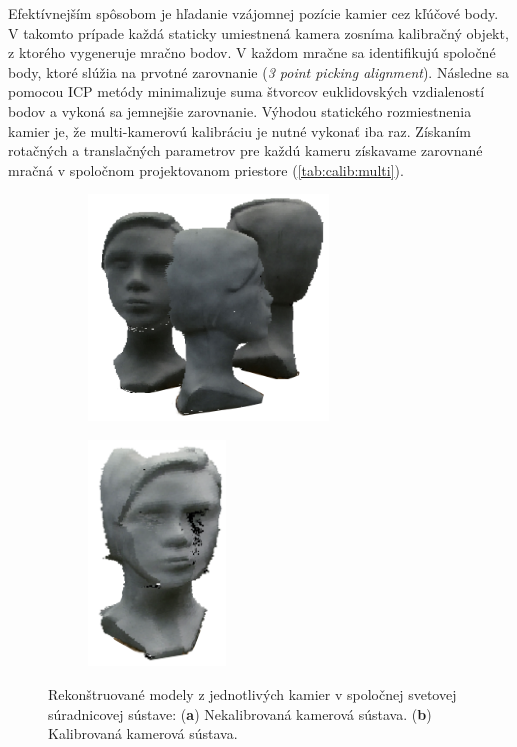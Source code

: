 Efektívnejším spôsobom je hľadanie vzájomnej pozície kamier cez kľúčové body. V takomto prípade každá staticky umiestnená kamera zosníma kalibračný objekt, z ktorého vygeneruje mračno bodov. V každom mračne sa identifikujú spoločné body, ktoré slúžia na prvotné zarovnanie (\textit{3 point picking alignment}). Následne sa pomocou ICP metódy minimalizuje suma štvorcov euklidovských vzdialeností bodov a vykoná sa jemnejšie zarovnanie. Výhodou statického rozmiestnenia kamier je, že multi-kamerovú kalibráciu je nutné vykonať iba raz. Získaním rotačných a translačných parametrov pre každú kameru získavame zarovnané mračná v spoločnom projektovanom priestore (\ref{tab:calib:multi}). 

\begin{figure}[h]
	\centering
	\begin{subfigure}[b]{0.48\textwidth}
		\centering
		\includegraphics[height=6cm]{figures/calibration_multi_uncalib.png}
		\caption{}
		\label{fig:calib:multi:uncalib}
	\end{subfigure}
	\hfill
	\begin{subfigure}[b]{0.48\textwidth}
		\centering
		\includegraphics[height=6cm]{figures/calibration_multi_calib.png}
		\caption{}
		\label{fig:calib:haus:calib}
	\end{subfigure}
	\caption{Rekonštruované modely z jednotlivých kamier v spoločnej svetovej súradnicovej sústave: (\textbf{a}) Nekalibrovaná kamerová sústava. (\textbf{b}) Kalibrovaná kamerová sústava.}
	\label{fig:calib:multi}
\end{figure}


